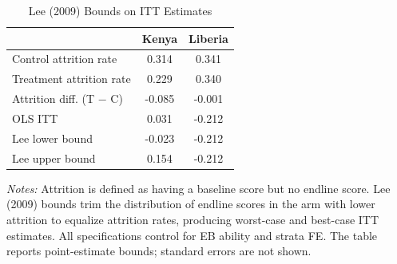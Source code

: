 \begin{table}[H]
\centering
\caption{Lee (2009) Bounds on ITT Estimates}
\label{tab:lee_bounds}
\begin{threeparttable}
\begin{tabular}[t]{lcc}
\toprule
 & Kenya & Liberia \\
\midrule
Control attrition rate & 0.314 & 0.341 \\
Treatment attrition rate & 0.229 & 0.340 \\
Attrition diff. (T $-$ C) & -0.085 & -0.001 \\
\addlinespace
OLS ITT &   0.031 &  -0.212 \\
\addlinespace
Lee lower bound &  -0.023 &  -0.212 \\
Lee upper bound &   0.154 &  -0.212 \\
\bottomrule
\end{tabular}
\begin{tablenotes}
\footnotesize
\item \textit{Notes:} Attrition is defined as having a baseline score but no endline score. Lee (2009) bounds trim the distribution of endline scores in the arm with lower attrition to equalize attrition rates, producing worst-case and best-case ITT estimates. All specifications control for EB ability and strata FE\@. The table reports point-estimate bounds; standard errors are not shown.
\end{tablenotes}
\end{threeparttable}
\end{table}
